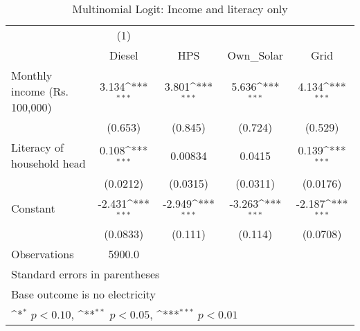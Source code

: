 \begin{table}[htbp]\centering
\def\sym#1{\ifmmode^{#1}\else\(^{#1}\)\fi}
\caption{Multinomial Logit: Income and literacy only}
\begin{tabular}{l*{4}{c}}
\toprule
                    &\multicolumn{1}{c}{(1)}         &                     &                     &                     \\
                    &      Diesel         &         HPS         &   Own\_Solar         &        Grid         \\
\midrule
Monthly income (Rs. 100,000)&       3.134\sym{***}&       3.801\sym{***}&       5.636\sym{***}&       4.134\sym{***}\\
                    &     (0.653)         &     (0.845)         &     (0.724)         &     (0.529)         \\
\addlinespace
Literacy of household head&       0.108\sym{***}&     0.00834         &      0.0415         &       0.139\sym{***}\\
                    &    (0.0212)         &    (0.0315)         &    (0.0311)         &    (0.0176)         \\
\addlinespace
Constant            &      -2.431\sym{***}&      -2.949\sym{***}&      -3.263\sym{***}&      -2.187\sym{***}\\
                    &    (0.0833)         &     (0.111)         &     (0.114)         &    (0.0708)         \\
\midrule
Observations        &      5900.0         &                     &                     &                     \\
\bottomrule
\multicolumn{5}{l}{\footnotesize Standard errors in parentheses}\\
\multicolumn{5}{l}{\footnotesize Base outcome is no electricity}\\
\multicolumn{5}{l}{\footnotesize \sym{*} \(p<0.10\), \sym{**} \(p<0.05\), \sym{***} \(p<0.01\)}\\
\end{tabular}
\end{table}
